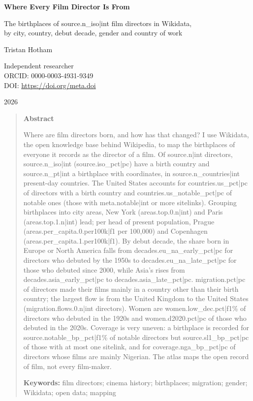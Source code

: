 \documentclass[11pt,a4paper]{article}
\begin{document}
\begin{center}
{\Large\bfseries Where Every Film Director Is From\par}
\vspace{0.4em}
{\large The birthplaces of {{source.n_iso|int}} film directors in Wikidata,\\by city, country, debut decade, gender and country of work\par}
\vspace{1.2em}
{\large Tristan Hotham\par}
\vspace{0.3em}
{\small Independent researcher\\
ORCID: 0000-0003-4931-9349\\
DOI: \href{https://doi.org/{{meta.doi}}}{https://doi.org/{{meta.doi}}}\par}
\vspace{0.8em}
2026
\end{center}

\begin{quote}
\small
\begin{center}\textbf{Abstract}\end{center}
Where are film directors born, and how has that changed? I use Wikidata, the open knowledge base behind Wikipedia, to map the birthplaces of everyone it records as the director of a film. Of {{source.n|int}} directors, {{source.n_iso|int}} ({{source.iso_pct|pc}}) have a birth country and {{source.n_pt|int}} a birthplace with coordinates, in {{source.n_countries|int}} present-day countries. The United States accounts for {{countries.us_pct|pc}} of directors with a birth country and {{countries.us_notable_pct|pc}} of notable ones (those with {{meta.notable|int}} or more sitelinks). Grouping birthplaces into city areas, New York ({{areas.top.0.n|int}}) and Paris ({{areas.top.1.n|int}}) lead; per head of present population, Prague ({{areas.per_capita.0.per100k|f1}} per 100,000) and Copenhagen ({{areas.per_capita.1.per100k|f1}}). By debut decade, the share born in Europe or North America falls from {{decades.eu_na_early_pct|pc}} for directors who debuted by the 1950s to {{decades.eu_na_late_pct|pc}} for those who debuted since 2000, while Asia's rises from {{decades.asia_early_pct|pc}} to {{decades.asia_late_pct|pc}}. {{migration.pct|pc}} of directors made their films mainly in a country other than their birth country; the largest flow is from the United Kingdom to the United States ({{migration.flows.0.n|int}} directors). Women are {{women.low_dec.pct|f1}}\% of directors who debuted in the 1920s and {{women.d2020.pct|pc}} of those who debuted in the 2020s. Coverage is very uneven: a birthplace is recorded for {{source.notable_bp_pct|f1}}\% of notable directors but {{source.sl1_bp_pct|pc}} of those with at most one sitelink, and for {{coverage.nga_bp_pct|pc}} of directors whose films are mainly Nigerian. The atlas maps the open record of film, not every film-maker.

\textbf{Keywords:} film directors; cinema history; birthplaces; migration; gender; Wikidata; open data; mapping
\end{quote}
\end{document}
